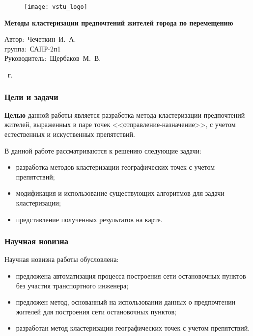 \begin{frame}
    \begin{figure}
        \hspace*{-320pt}\texttt{[image: vstu\_logo]}
    \end{figure}
    \vspace{2em}
    \begin{center}
        \large
        \textbf{Методы кластеризации предпочтений жителей города по перемещению}\\
    \end{center}
    \vspace{2em}
    \begin{flushleft}
        \hspace{12em}Автор:~Чечеткин~И.~А.\\
        \hspace{12em}группа:~САПР-2п1\\
        \hspace{12em}Руководитель:~Щербаков~М.~В.
    \end{flushleft}
    \vspace{3em}
     \the\year\ г.
\end{frame}

\begin{frame}
    \frametitle{Цели и задачи}
    \textbf{Целью} данной работы является разработка метода кластеризации предпочтений жителей, выраженных в паре точек <<отправление-назначение>>, с учетом естественных и искуственных препятствий.

    В данной работе рассматриваются к решению следующие задачи:
    \begin{itemize}
        \item разработка методов кластеризации географических точек с учетом препятствий;
        \item модификация и использование существующих алгоритмов для задачи кластеризации;
        \item представление полученных результатов на карте.
    \end{itemize}
\end{frame}

\begin{frame}
    \frametitle{Научная новизна}
    Научная новизна работы обусловлена:
    \begin{itemize}
        \item предложена автоматизация процесса построения сети остановочных пунктов без участия транспортного инженера;
        \item предложен метод, основанный на использовании данных о предпочтении жителей для построения сети остановочных пунктов;
        \item разработан метод кластеризации географических точек с учетом препятствий.
    \end{itemize}
\end{frame}

